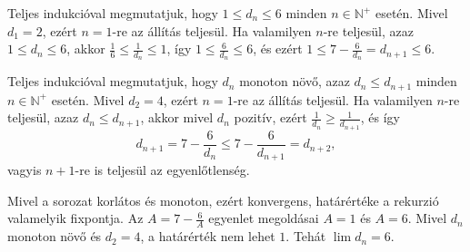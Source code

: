\documentclass[11pt]{scrartcl}
\begin{document}
Teljes indukcióval megmutatjuk, hogy $1 \le d_n \le 6$ minden
$n \in \mathbb{N}^+$ esetén. Mivel $d_1 = 2$, ezért $n = 1$-re az állítás
teljesül. Ha valamilyen $n$-re teljesül, azaz $1 \le d_n \le 6$, akkor
$\frac{1}{6} \le \frac{1}{d_n} \le 1$, így $1 \le \frac{6}{d_n} \le 6$, és
ezért $1 \le 7 - \frac{6}{d_n} = d_{n + 1} \le 6$.

Teljes indukcióval megmutatjuk, hogy $d_n$ monoton növő, azaz
$d_n \le d_{n + 1}$ minden $n \in \mathbb{N}^+$ esetén. Mivel $d_2 = 4$,
ezért $n = 1$-re az állítás teljesül. Ha valamilyen $n$-re teljesül, azaz
$d_n \le d_{n + 1}$, akkor mivel $d_n$ pozitív, ezért
$\frac{1}{d_n} \ge \frac{1}{d_{n + 1}}$, és így
\[
	d_{n + 1} = 7 - \frac{6}{d_n} \le 7 - \frac{6}{d_{n + 1}} = d_{n + 2},
\]
vagyis $n + 1$-re is teljesül az egyenlőtlenség.

Mivel a sorozat korlátos és monoton, ezért konvergens, határértéke a
rekurzió valamelyik fixpontja. Az $A = 7 - \frac{6}{A}$ egyenlet megoldásai
$A = 1$ és $A = 6$. Mivel $d_n$ monoton növő és $d_2 = 4$, a határérték nem
lehet $1$. Tehát $\lim d_n = 6$.
\end{document}

